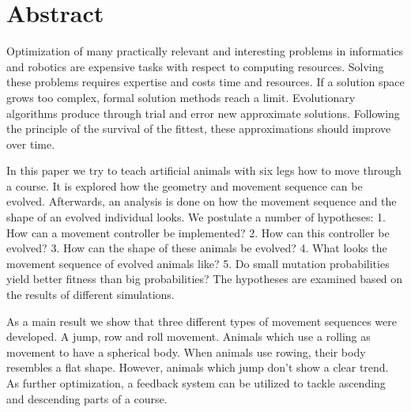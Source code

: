 %
%


\chapter{Abstract}

  Optimization of many practically relevant and
  interesting problems in informatics and robotics are expensive tasks with respect to computing resources.
  Solving these problems requires expertise and costs time and resources.
  If a solution space grows too complex, formal solution methods reach a limit.
  Evolutionary algorithms produce through trial and error new approximate solutions.
  Following the principle of the survival of the fittest, these approximations should improve over time.

  \smallskip

  In this paper we try to teach artificial animals with six legs how to move through a course.
  It is explored how the geometry and movement sequence can be evolved.
  Afterwards, an analysis is done on how the movement sequence and the shape of an evolved individual looks.
  We postulate a number of hypotheses:
  1. How can a movement controller be implemented?
  2. How can this controller be evolved?
  3. How can the shape of these animals be evolved?
  4. What looks the movement sequence of evolved animals like?
  5. Do small mutation probabilities yield better fitness than big probabilities?
  The hypotheses are examined based on the results of different simulations.

  \smallskip

  As a main result we show that three different types of movement sequences were developed.
  A jump, row and roll movement. Animals which use a rolling as movement to have a spherical body.
  When animals use rowing, their body resembles a flat shape. However, animals which jump don't show a clear trend.
  As further optimization, a feedback system can be utilized to tackle ascending and descending parts of a course.

